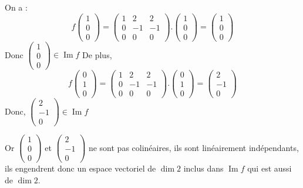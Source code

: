 \documentclass[a4paper,12pt]{article}
\DeclareMathOperator{\Img}{Im}
\DeclareMathOperator{\di}{dim}
\begin{document}
On a :
$$f\begin{pmatrix}1\\0\\0\end{pmatrix}=\begin{pmatrix}1&2&2\\0&-1&-1\\0&0&0\end{pmatrix}.\begin{pmatrix}1\\0\\0\end{pmatrix}=\begin{pmatrix}1\\0\\0\end{pmatrix}$$
Donc $\begin{pmatrix}1\\0\\0\end{pmatrix}\in\Img f$
De plus,
$$f\begin{pmatrix}0\\1\\0\end{pmatrix}=\begin{pmatrix}1&2&2\\0&-1&-1\\0&0&0\end{pmatrix}.\begin{pmatrix}0\\1\\0\end{pmatrix}=\begin{pmatrix}2\\-1\\0\end{pmatrix}$$
Donc, $\begin{pmatrix}2\\-1\\0\end{pmatrix}\in\Img f$

Or $\begin{pmatrix}1\\0\\0\end{pmatrix}$ et $\begin{pmatrix}2\\-1\\0\end{pmatrix}$ ne sont pas colinéaires, ils sont linéairement indépendants, ils engendrent donc un espace vectoriel de $\di 2$ inclus dans $\Img f$ qui est aussi de $\di 2$.
\end{document}
